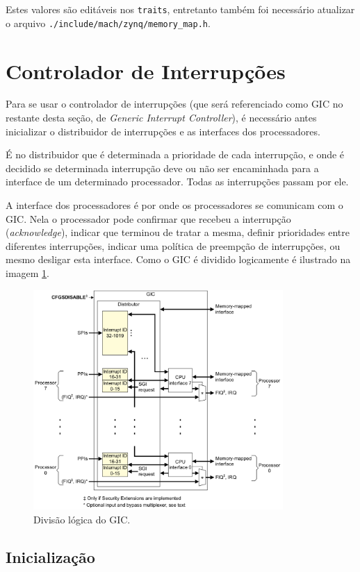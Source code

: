 Estes valores são editáveis nos \verb+traits+, entretanto também foi necessário atualizar o arquivo \verb+./include/mach/zynq/memory_map.h+.

\section{Controlador de Interrupções}

Para se usar o controlador de interrupções (que será referenciado como GIC no restante desta seção, de \emph{Generic Interrupt Controller}), é necessário antes inicializar o distribuidor de interrupções e as interfaces dos processadores.

É no distribuidor que é determinada a prioridade de cada interrupção, e onde é decidido se determinada interrupção deve ou não ser encaminhada para a interface de um determinado processador. Todas as interrupções passam por ele.

A interface dos processadores é por onde os processadores se comunicam com o GIC. Nela o processador pode confirmar que recebeu a interrupção (\emph{acknowledge}), indicar que terminou de tratar a mesma, definir prioridades entre diferentes interrupções, indicar uma política de preempção de interrupções, ou mesmo desligar esta interface. Como o GIC é dividido logicamente é ilustrado na imagem \ref{img:gic}.

\begin{figure}[ht!]
    \centering
    \includegraphics[width=9.5cm]{figuras/gic}
    \caption{Divisão lógica do GIC.}
    \label{img:gic}
\end{figure}

\subsection{Inicialização}

